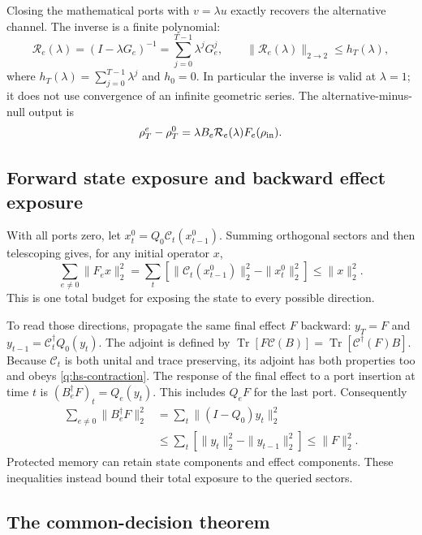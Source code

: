 \documentclass[11pt,a4paper]{article}
\numberwithin{equation}{section}
\theoremstyle{definition}
\theoremstyle{remark}
\DeclareMathOperator{\Tr}{Tr}
\begin{document}
Closing the mathematical ports with $v=\lambda u$ exactly recovers the
alternative channel. The inverse is a finite polynomial:
\begin{equation}
 \mathcal R_e(\lambda)=(I-\lambda G_e)^{-1}
   =\sum_{j=0}^{T-1}\lambda^jG_e^j,\qquad
 \|\mathcal R_e(\lambda)\|_{2\to2}\leq h_T(\lambda),
 \label{q:resolvent}
\end{equation}
where $h_T(\lambda)=\sum_{j=0}^{T-1}\lambda^j$ and $h_0=0$.
In particular the inverse is valid at $\lambda=1$; it does not use convergence
of an infinite geometric series. The alternative-minus-null output is
\begin{equation}
 \rho_T^e-\rho_T^0
   =\lambda B_e\mathcal R_e(\lambda)F_e(\rho_{\rm in}).
 \label{q:feedback-identity}
\end{equation}

\subsection{Forward state exposure and backward effect exposure}

With all ports zero, let $x_t^0=Q_0\mathcal C_t(x_{t-1}^0)$. Summing
orthogonal sectors and then telescoping gives, for any initial operator $x$,
\[
 \sum_{e\ne0}\|F_ex\|_2^2
 =\sum_t\left[\|\mathcal C_t(x_{t-1}^0)\|_2^2-\|x_t^0\|_2^2\right]
 \leq\|x\|_2^2.
\]
This is one total budget for exposing the state to every possible direction.

To read those directions, propagate the same final effect $F$ backward:
$y_T=F$ and $y_{t-1}=\mathcal C_t^\dagger Q_0(y_t)$.
The adjoint is defined by
$\Tr[F\mathcal C(B)]=\Tr[\mathcal C^\dagger(F)B]$.
Because $\mathcal C_t$ is both unital and trace preserving, its adjoint has
both properties too and obeys \eqref{q:hs-contraction}.
The response of the final effect to a port insertion at time $t$ is
$(B_e^\dagger F)_t=Q_e(y_t)$. This includes $Q_eF$ for the last port.
Consequently
\begin{align}
 \sum_{e\ne0}\|B_e^\dagger F\|_2^2
 &=\sum_t\|(I-Q_0)y_t\|_2^2 \nonumber\\
 &\leq\sum_t\left[\|y_t\|_2^2-\|y_{t-1}\|_2^2\right]
 \leq\|F\|_2^2 .
 \label{q:backward-budget}
\end{align}
Protected memory can retain state components and effect components. These
inequalities instead bound their total exposure to the queried sectors.

\subsection{The common-decision theorem}
\end{document}
